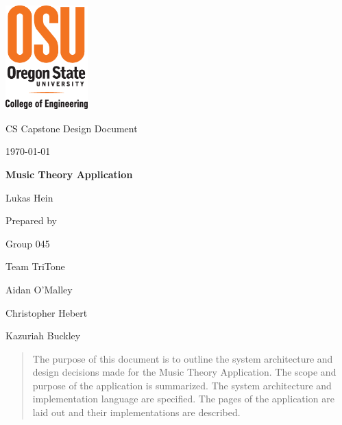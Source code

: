 \documentclass[onecolumn, draftclsnofoot,10pt, compsoc]{IEEEtran}
\def \CapstoneTeamName{		Team TriTone}
\def \CapstoneTeamNumber{		045}
\def \GroupMemberOne{			Aidan O'Malley}
\def \GroupMemberTwo{			Christopher Hebert}
\def \GroupMemberThree{			Kazuriah Buckley}
\def \CapstoneProjectName{		Music Theory Application}
\def \CapstoneSponsorPerson{		Lukas Hein}
\def \DocType{		%
  Design Document
				}
\newcommand{\NameSigPair}[1]{\par
\makebox[2.75in][r]{#1} \hfil 	\makebox[3.25in]{\makebox[2.25in]{\hrulefill} \hfill		\makebox[.75in]{\hrulefill}}
\par\vspace{-12pt} \textit{\tiny\noindent
\makebox[2.75in]{} \hfil		\makebox[3.25in]{\makebox[2.25in][r]{Signature} \hfill	\makebox[.75in][r]{Date}}}}
\renewcommand{\NameSigPair}[1]{#1}
\begin{document}
\begin{titlepage}
    \begin{singlespace}
    	\includegraphics[height=4cm]{coe_v_spot1}
        \hfill 
        \par\vspace{.2in}
        \centering
        \scshape{
            \huge CS Capstone \DocType \par
            {\large\today}\par
            \vspace{.5in}
            \textbf{\Huge\CapstoneProjectName}\par
            \vfill
            \vspace{5pt}
                   {\Large\NameSigPair{\CapstoneSponsorPerson}\par}
            {\large Prepared by }\par
            Group\CapstoneTeamNumber\par
            \CapstoneTeamName\par 
            \vspace{5pt}
            {\Large
                \NameSigPair{\GroupMemberOne}\par
                \NameSigPair{\GroupMemberTwo}\par
                \NameSigPair{\GroupMemberThree}\par
            }
            \vspace{20pt}
        }
        \begin{abstract}
          The purpose of this document is to outline the system architecture and design decisions made for the Music Theory Application.
          The scope and purpose of the application is summarized.
          The system architecture and implementation language are specified.
          The pages of the application are laid out and their implementations are described.
        \end{abstract}     
    \end{singlespace}
\end{titlepage}
\newpage
{}
\tableofcontents
\clearpage
\end{document}

